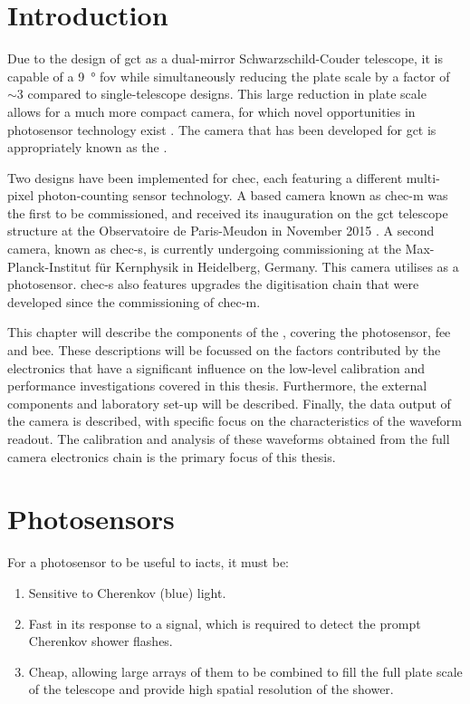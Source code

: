 \section{Introduction}

Due to the design of \gls{gct} as a dual-mirror Schwarzschild-Couder telescope, it is capable of a \SI{9}{\degree} \gls{fov}  while simultaneously reducing the plate scale by a factor of $\sim 3$ compared to single-telescope designs. This large reduction in plate scale allows for a much more compact camera, for which novel opportunities in photosensor technology exist \cite{Vassiliev2007}. The camera that has been developed for \gls{gct} is appropriately known as the .

Two designs have been implemented for \gls{chec}, each featuring a different multi-pixel photon-counting sensor technology. A  based camera known as \gls{chec-m} was the first to be commissioned, and received its inauguration on the \gls{gct} telescope structure at the Observatoire de Paris-Meudon in November 2015 \cite{Watson2017}. A second camera, known as \gls{chec-s}, is currently undergoing commissioning at the Max-Planck-Institut für Kernphysik in Heidelberg, Germany. This camera utilises  as a photosensor. \gls{chec-s} also features upgrades the digitisation chain that were developed since the commissioning of \gls{chec-m}.

This chapter will describe the components of the , covering the photosensor, \gls{fee} and \gls{bee}. These descriptions will be focussed on the factors contributed by the electronics that have a significant influence on the low-level calibration and performance investigations covered in this thesis. Furthermore, the external components and laboratory set-up will be described. Finally, the data output of the camera is described, with specific focus on the characteristics of the waveform readout. The calibration and analysis of these waveforms obtained from the full camera electronics chain is the primary focus of this thesis.

\section{Photosensors}

For a photosensor to be useful to \glspl{iact}, it must be:
\begin{enumerate}
\item Sensitive to Cherenkov (blue) light.
\item Fast in its response to a signal, which is required to detect the prompt Cherenkov shower flashes.
\item Cheap, allowing large arrays of them to be combined to fill the full plate scale of the telescope and provide high spatial resolution of the shower.
\end{enumerate}

